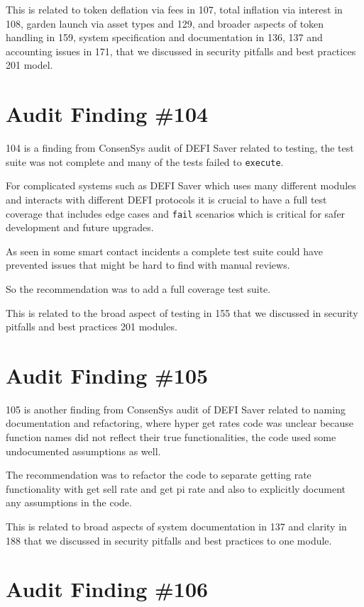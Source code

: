 This is related to token deflation via fees in 107, total inflation via interest in 108, garden launch via asset types and 129, and broader aspects of token handling in 159, system specification and documentation in 136, 137 and accounting issues in 171, that we discussed in security pitfalls and best practices 201 model.

\section{Audit Finding \#104}

104 is a finding from ConsenSys audit of DEFI Saver related to testing, the test suite was not complete and many of the tests failed to \verb|execute|. 

For complicated systems such as DEFI Saver which uses many different modules and interacts with different DEFI protocols it is crucial to have a full test coverage that includes edge cases and \verb|fail| scenarios which is critical for safer development and future upgrades.

As seen in some smart contact incidents a complete test suite could have prevented issues that might be hard to find with manual reviews. 

So the recommendation was to add a full coverage test suite.

This is related to the broad aspect of testing in 155 that we discussed in security pitfalls and best practices 201 modules.

\section{Audit Finding \#105}

105 is another finding from ConsenSys audit of DEFI Saver related to naming documentation and refactoring, where hyper get rates code was unclear because function names did not reflect their true functionalities, the code used some undocumented assumptions as well. 

The recommendation was to refactor the code to separate getting rate functionality with get sell rate and get pi rate and also to explicitly document any assumptions in the code. 

This is related to broad aspects of system documentation in 137 and clarity in 188 that we discussed in security pitfalls and best practices to one module.

\section{Audit Finding \#106}

